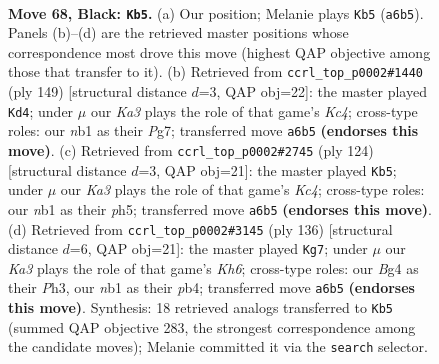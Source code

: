\documentclass[11pt]{article}
\begin{document}
\clearpage

\begin{figure}[p]\centering
\begin{subfigure}{0.46\textwidth}\centering
\resizebox{\linewidth}{!}{%
\newchessgame
\chessboard[
  setfen={3B4/8/k7/p7/2p3b1/8/5K2/1N6 b - - 5 68},
  showmover=false,
  pgfstyle=straightmove, color=movearrow, markmove={a6-b5}
]}
\caption{}
\end{subfigure}\hfill
\begin{subfigure}{0.46\textwidth}\centering
\resizebox{\linewidth}{!}{%
\newchessgame
\chessboard[
  setfen={8/6p1/6P1/2kp4/7b/8/B3K3/8 b - - 55 75},
  showmover=false,
  pgfstyle=straightmove, color=movearrow, markmove={c5-d4}
]}
\caption{}
\end{subfigure}
\\[4pt]
\begin{subfigure}{0.46\textwidth}\centering
\resizebox{\linewidth}{!}{%
\newchessgame
\chessboard[
  setfen={2B5/k3b3/8/7p/PPK5/8/8/8 w - - 8 63},
  showmover=false,
  pgfstyle=straightmove, color=movearrow, markmove={c4-b5}
]}
\caption{}
\end{subfigure}\hfill
\begin{subfigure}{0.46\textwidth}\centering
\resizebox{\linewidth}{!}{%
\newchessgame
\chessboard[
  setfen={8/4k3/6PK/8/1p6/3b3P/1P6/8 w - - 1 69},
  showmover=false,
  pgfstyle=straightmove, color=movearrow, markmove={h6-g7}
]}
\caption{}
\end{subfigure}
\caption{\textbf{Move 68, Black: \texttt{Kb5}.} (a) Our position; Melanie plays \texttt{Kb5} (\texttt{a6b5}). Panels (b)--(d) are the retrieved master positions whose correspondence most drove this move (highest QAP objective among those that transfer to it). (b) Retrieved from \texttt{ccrl\_top\_p0002\#1440} (ply 149) [structural distance $d$=3, QAP obj=22]: the master played \texttt{Kd4}; under $\mu$ our \emph{Ka3} plays the role of that game's \emph{Kc4}; cross-type roles: our \emph{n}b1 as their \emph{P}g7; transferred move \texttt{a6b5} \textbf{(endorses this move)}. (c) Retrieved from \texttt{ccrl\_top\_p0002\#2745} (ply 124) [structural distance $d$=3, QAP obj=21]: the master played \texttt{Kb5}; under $\mu$ our \emph{Ka3} plays the role of that game's \emph{Kc4}; cross-type roles: our \emph{n}b1 as their \emph{p}h5; transferred move \texttt{a6b5} \textbf{(endorses this move)}. (d) Retrieved from \texttt{ccrl\_top\_p0002\#3145} (ply 136) [structural distance $d$=6, QAP obj=21]: the master played \texttt{Kg7}; under $\mu$ our \emph{Ka3} plays the role of that game's \emph{Kh6}; cross-type roles: our \emph{B}g4 as their \emph{P}h3, our \emph{n}b1 as their \emph{p}b4; transferred move \texttt{a6b5} \textbf{(endorses this move)}. Synthesis: 18 retrieved analogs transferred to \texttt{Kb5} (summed QAP objective 283, the strongest correspondence among the candidate moves); Melanie committed it via the \texttt{search} selector.}
\label{fig:thought-m135}
\end{figure}
\end{document}
